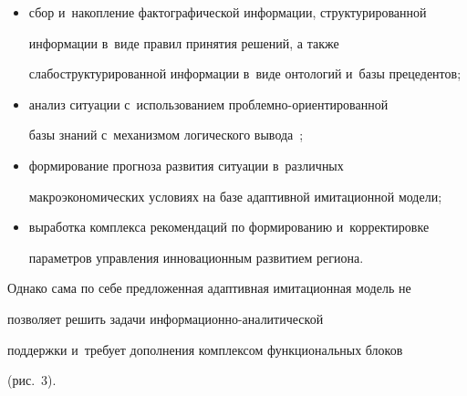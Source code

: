   \begin{itemize}


\item сбор и~накопление фактографической информации, структурированной 


информации в~виде правил принятия решений, а также 


слабоструктурированной информации в~виде онтологий и~базы прецедентов;


\item анализ ситуации с~использованием проб\-лем\-но-ори\-ен\-ти\-ро\-ван\-ной 


базы знаний с~механизмом логического вывода~\cite{6-or};


\item формирование прогноза развития ситуации в~различных 


макроэкономических условиях на базе адаптивной имитационной модели;


\item выработка комплекса рекомендаций по формированию и~корректировке 


па\-ра\-мет\-ров управ\-ле\-ния инновационным развитием региона.


\end{itemize}


  


  Однако сама по себе предложенная адаптивная имитационная модель не 


позволяет решить задачи ин\-фор\-ма\-ци\-он\-но-ана\-ли\-ти\-че\-ской 


поддержки и~требует дополнения комплексом функциональных блоков 


(рис.~3).





